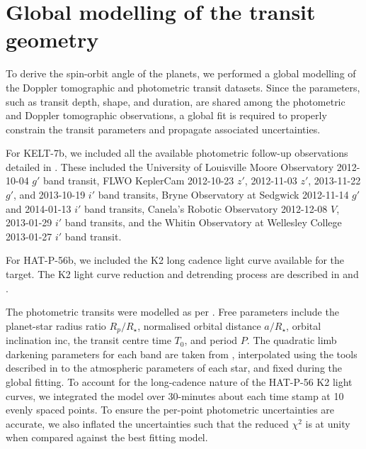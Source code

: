 \documentclass[useAMS,usenatbib]{mn2e}
\begin{document}
\section{Global modelling of the transit geometry}
\label{sec:modelling}

To derive the spin-orbit angle of the planets, we performed a global modelling of the Doppler tomographic and photometric transit datasets. Since the parameters, such as transit depth, shape, and duration, are shared among the photometric and Doppler tomographic observations, a global fit is required to properly constrain the transit parameters and propagate associated uncertainties.

For KELT-7b, we included all the available photometric follow-up observations detailed in \citet{2015AJ....150...12B}. These included the University of Louisville Moore Observatory 2012-10-04 $g'$ band transit, FLWO KeplerCam 2012-10-23 $z'$, 2012-11-03 $z'$, 2013-11-22 $g'$, and 2013-10-19 $i'$ band transits, Bryne Observatory at Sedgwick 2012-11-14 $g'$ and 2014-01-13 $i'$ band transits, Canela's Robotic Observatory 2012-12-08 $V$, 2013-01-29 $i'$ band transits, and the Whitin Observatory at Wellesley College 2013-01-27 $i'$ band transit.

For HAT-P-56b, we included the K2 long cadence light curve available for the target. The K2 light curve reduction and detrending process are described in \citet{2015AJ....150...85H} and \citet{2015MNRAS.454.4159H}. 

The photometric transits were modelled as per \citet{2002ApJ...580L.171M}. Free parameters include the planet-star radius ratio $R_p/R_\star$, normalised orbital distance $a/R_\star$, orbital inclination inc, the transit centre time $T_0$, and period $P$. The quadratic limb darkening parameters for each band are taken from \citet{2011A&A...529A..75C}, interpolated using the tools described in \citet{2013PASP..125...83E} to the atmospheric parameters of each star, and fixed during the global fitting. To account for the long-cadence nature of the HAT-P-56 K2 light curves, we integrated the model over 30-minutes about each time stamp at 10 evenly spaced points. To ensure the per-point photometric uncertainties are accurate, we also inflated the uncertainties such that the reduced $\chi^2$ is at unity when compared against the best fitting model. 
\end{document}
